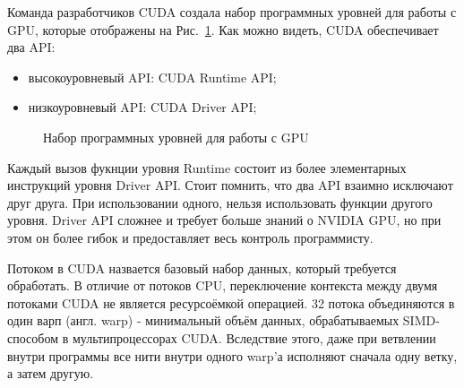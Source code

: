 \documentclass[a4paper,14pt,russian]{extreport}
\begin{document}
\par Команда разработчиков CUDA  создала набор программных уровней для работы с GPU, которые отображены на Рис.~\ref{ris:cuda_levels}. Как можно видеть, CUDA обеспечивает два API:
  \begin{itemize}
  \item высокоуровневый API: CUDA Runtime API;
  \item низкоуровневый API: CUDA Driver API;
  \end{itemize}
\par
  \begin{figure}[h]
  \caption{Набор программных уровней для работы с GPU}
  \label{ris:cuda_levels}
  \end{figure}
\par Каждый вызов фукнции уровня Runtime состоит из более элементарных инструкций уровня Driver API. Стоит помнить, что два API взаимно исключают друг друга. При использовании одного, нельзя использовать функции другого уровня. Driver API сложнее и требует больше знаний о NVIDIA GPU, но при этом он более гибок и предоставляет весь контроль программисту. 
\par Потоком в CUDA назвается базовый набор данных, который требуется обработать. В отличие от потоков CPU, переключение контекста между двумя потоками CUDA не является ресурсоёмкой операцией. 32 потока объединяются в один варп (англ. warp) - минимальный объём данных, обрабатываемых SIMD-способом в мультипроцессорах CUDA. Вследствие этого, даже при ветвлении внутри программы все нити внутри одного warp'а исполняют сначала одну ветку, а затем другую. 
\end{document}
